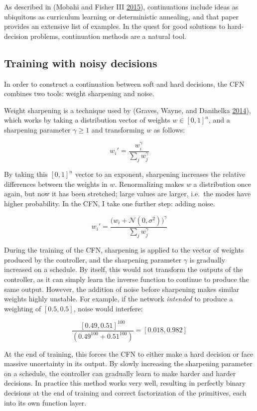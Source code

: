 \documentclass[12pt,twoside]{mitthesis}
\begin{document}
As described in (Mobahi and Fisher III
\protect\hyperlink{ref-mobahi2015theoretical}{2015}), continuations
include ideas as ubiquitous as curriculum learning or deterministic
annealing, and that paper provides an extensive list of examples. In the
quest for good solutions to hard-decision problems, continuation methods
are a natural tool.

\subsection{Training with noisy
decisions}\label{training-with-noisy-decisions}

In order to construct a continuation between soft and hard decisions,
the CFN combines two tools: weight sharpening and noise.

Weight sharpening is a technique used by (Graves, Wayne, and Danihelka
\protect\hyperlink{ref-graves2014neural}{2014}), which works by taking a
distribution vector of weights \(w \in [0,1]^n\), and a sharpening
parameter \(\gamma \ge 1\) and transforming \(w\) as follows:

\[w_i' = \frac{w_i^{\gamma}}{\sum_j w_j^{\gamma}}\]

By taking this \([0,1]^n\) vector to an exponent, sharpening increases
the relative differences between the weights in \(w\). Renormalizing
makes \(w\) a distribution once again, but now it has been stretched;
large values are larger, i.e.~the modes have higher probability. In the
CFN, I take one further step: adding noise.

\[w_i' = \frac{\big(w_i + \mathcal{N}(0, \sigma^2)\big)^{\gamma}}{\sum_j w_j^{\gamma}}\]

During the training of the CFN, sharpening is applied to the vector of
weights produced by the controller, and the sharpening parameter
\(\gamma\) is gradually increased on a schedule. By itself, this would
not transform the outputs of the controller, as it can simply learn the
inverse function to continue to produce the same output. However, the
addition of noise before sharpening makes similar weights highly
unstable. For example, if the network \emph{intended} to produce a
weighting of \([0.5, 0.5]\), noise would interfere:

\[\frac{[0.49, 0.51]^{100}}{(0.49^{100} + 0.51^{100})} = [0.018, 0.982]\]

At the end of training, this forces the CFN to either make a hard
decision or face massive uncertainty in its output. By slowly increasing
the sharpening parameter on a schedule, the controller can gradually
learn to make harder and harder decisions. In practice this method works
very well, resulting in perfectly binary decisions at the end of
training and correct factorization of the primitives, each into its own
function layer.
\end{document}
